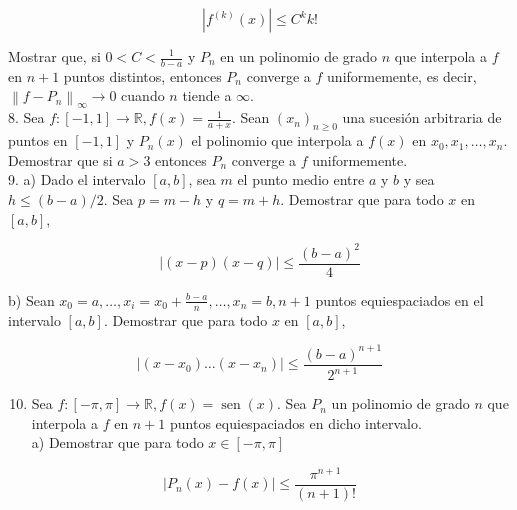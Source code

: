\documentclass[10pt]{article}
\begin{document}
$$
\left|f^{(k)}(x)\right| \leq C^{k} k!
$$

Mostrar que, si $0<C<\frac{1}{b-a}$ y $P_{n}$ en un polinomio de grado $n$ que interpola a $f$ en $n+1$ puntos distintos, entonces $P_{n}$ converge a $f$ uniformemente, es decir, $\left\|f-P_{n}\right\|_{\infty} \rightarrow 0$ cuando $n$ tiende a $\infty$.\\
8. Sea $f:[-1,1] \rightarrow \mathbb{R}, f(x)=\frac{1}{a+x}$. Sean $\left(x_{n}\right)_{n \geq 0}$ una sucesión arbitraria de puntos en $[-1,1]$ y $P_{n}(x)$ el polinomio que interpola a $f(x)$ en $x_{0}, x_{1}, \ldots, x_{n}$. Demostrar que si $a>3$ entonces $P_{n}$ converge a $f$ uniformemente.\\
9. a) Dado el intervalo $[a, b]$, sea $m$ el punto medio entre $a$ y $b$ y sea $h \leq(b-a) / 2$. Sea $p=m-h$ y $q=m+h$. Demostrar que para todo $x$ en $[a, b]$,

$$
|(x-p)(x-q)| \leq \frac{(b-a)^{2}}{4}
$$

b) Sean $x_{0}=a, \ldots, x_{i}=x_{0}+\frac{b-a}{n}, \ldots, x_{n}=b, n+1$ puntos equiespaciados en el intervalo $[a, b]$. Demostrar que para todo $x$ en $[a, b]$,

$$
\left|\left(x-x_{0}\right) \ldots\left(x-x_{n}\right)\right| \leq \frac{(b-a)^{n+1}}{2^{n+1}}
$$

\begin{enumerate}
  \setcounter{enumi}{9}
  \item Sea $f:[-\pi, \pi] \rightarrow \mathbb{R}, f(x)=\operatorname{sen}(x)$. Sea $P_{n}$ un polinomio de grado $n$ que interpola a $f$ en $n+1$ puntos equiespaciados en dicho intervalo.\\
a) Demostrar que para todo $x \in[-\pi, \pi]$
\end{enumerate}

$$
\left|P_{n}(x)-f(x)\right| \leq \frac{\pi^{n+1}}{(n+1)!}
$$
\end{document}
